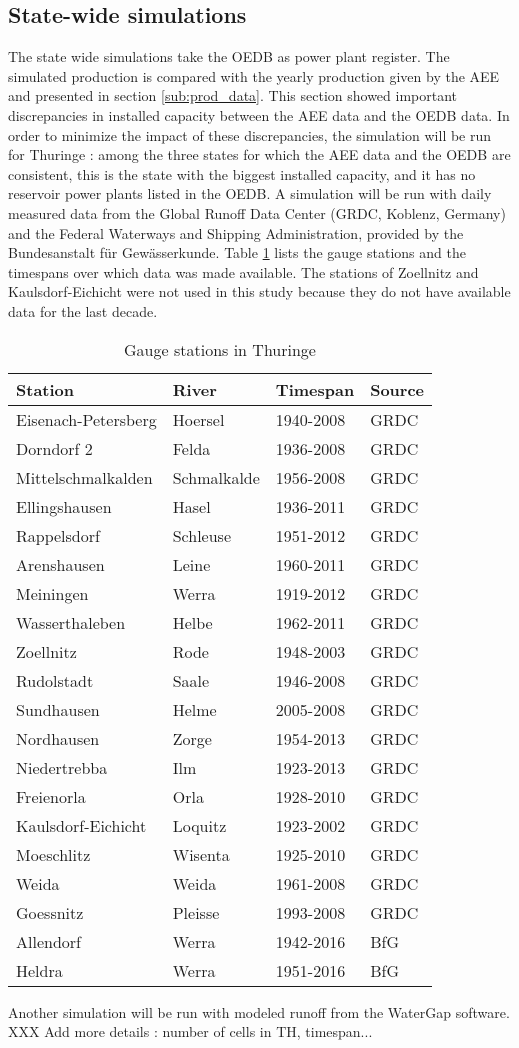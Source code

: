 \subsection{State-wide simulations} 
\label{sub:metho_sw}
The state wide simulations take the OEDB as power plant register. The simulated production is compared with the yearly production given by the AEE and presented in section \ref{sub:prod_data}. This section showed important discrepancies in installed capacity between the AEE data and the OEDB data. In order to minimize the impact of these discrepancies, the simulation will be run for Thuringe : among the three states for which the AEE data and the OEDB are consistent, this is the state with the biggest installed capacity, and it has no reservoir power plants listed in the OEDB. \newline
A simulation will be run with daily measured data from the Global Runoff Data Center (GRDC, Koblenz, Germany) and the Federal Waterways and Shipping Administration, provided by the Bundesanstalt für Gewässerkunde. Table \ref{quelle_runoff_th} lists the gauge stations and the timespans over which data was made available. The stations of Zoellnitz and Kaulsdorf-Eichicht were not used in this study because they do not have available data for the last decade.
\begin{table}
\footnotesize
 \centering
 \caption{Gauge stations in Thuringe}
 \label{quelle_runoff_th}
 \begin{tabular}{|l|l|l|l|}
  \hline
  \textbf{Station}&\textbf{River}&\textbf{Timespan}&\textbf{Source}\\
  \hline
  Eisenach-Petersberg&Hoersel&1940-2008&GRDC\\
  Dorndorf 2&Felda&1936-2008&GRDC\\
  Mittelschmalkalden&Schmalkalde&1956-2008&GRDC\\
  Ellingshausen&Hasel&1936-2011&GRDC\\
  Rappelsdorf&Schleuse&1951-2012&GRDC\\
  Arenshausen&Leine&1960-2011&GRDC\\
  Meiningen&Werra&1919-2012&GRDC\\
  Wasserthaleben&Helbe&1962-2011&GRDC\\
  Zoellnitz&Rode&1948-2003&GRDC\\
  Rudolstadt&Saale&1946-2008&GRDC\\
  Sundhausen&Helme&2005-2008&GRDC\\
  Nordhausen&Zorge&1954-2013&GRDC\\
  Niedertrebba&Ilm&1923-2013&GRDC\\
  Freienorla&Orla&1928-2010&GRDC\\
  Kaulsdorf-Eichicht&Loquitz&1923-2002&GRDC\\
  Moeschlitz&Wisenta&1925-2010&GRDC\\
  Weida&Weida&1961-2008&GRDC\\
  Goessnitz&Pleisse&1993-2008&GRDC\\
  Allendorf&Werra&1942-2016&BfG\\
  Heldra&Werra&1951-2016&BfG\\
  \hline
 \end{tabular}
\end{table}

Another simulation will be run with modeled runoff from the WaterGap software. XXX Add more details : number of cells in TH, timespan... 
